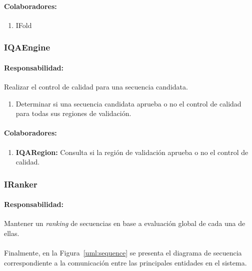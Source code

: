     \paragraph{Colaboradores:}
      \begin{enumerate}
       \item IFold
      \end{enumerate}

  \subsubsection{IQAEngine}
    \paragraph{Responsabilidad:} Realizar el control de calidad para una
secuencia candidata.
      \begin{enumerate}             
       \item Determinar si una secuencia candidata aprueba o no el control de
calidad para todas sus regiones de validaci\'on.
      \end{enumerate}
    \paragraph{Colaboradores:}
      \begin{enumerate}
       \item \textbf{IQARegion:} Consulta si la regi\'on de validaci\'on aprueba
o no el control de calidad.
      \end{enumerate}

  \subsubsection{IRanker}
    \paragraph{Responsabilidad:} Mantener un \textit{ranking} de secuencias en
base a evaluaci\'on global de cada una de ellas.    

\paragraph{}
Finalmente, en la Figura~\ref{uml:sequence} se presenta el diagrama de
secuencia correspondiente a la comunicaci\'on entre las principales entidades en
el sistema.

